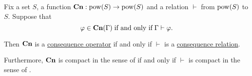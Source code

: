 \begin{proposition}\label{thm:consequence_operators_and_relations}
  Fix a set \( S \), a function \( \op*{Cn}: \pow(S) \to \pow(S) \) and a relation \( \vdash \) from \( \operatorname{pow}(S) \) to \( S \). Suppose that
  \begin{equation}\label{eq:thm:consequence_operators_and_relations}
    \varphi \in \op*{Cn}(\Gamma) \T{if and only if} \Gamma \vdash \varphi.
  \end{equation}

  Then \( \op*{Cn} \) is a \hyperref[def:consequence_operator]{consequence operator} if and only if \( {\vdash} \) is a \hyperref[def:consequence_relation]{consequence relation}.

  Furthermore, \( \op*{Cn} \) is compact in the sense of  if and only if \( \vdash \) is compact in the sense of .
\end{proposition}
